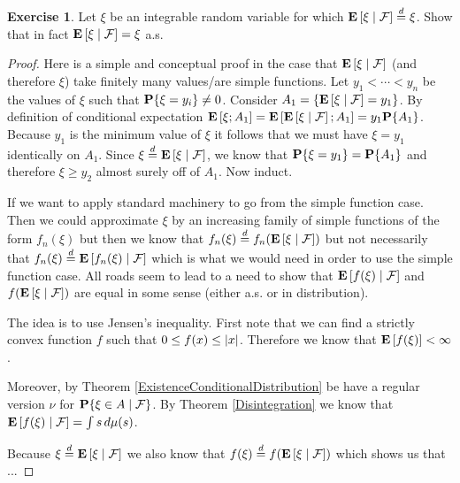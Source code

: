 \documentclass{amsart}
\theoremstyle{remark}
\theoremstyle{definition}
\newtheorem{ex}[thm]{Exercise}
\begin{document}
\begin{ex}Let $\xi$ be an integrable random variable for which
  $\cexpectationlong{\mathcal{F}}{\xi} \eqdist \xi$.  Show that in
  fact $\cexpectationlong{\mathcal{F}}{\xi} = \xi$ a.s.
\end{ex}
\begin{proof}
Here is a simple and conceptual proof in the case that
$\cexpectationlong{\mathcal{F}}{\xi}$ (and therefore $\xi$) take
finitely many values/are simple functions.  Let $y_1 < \cdots < y_n$ be the values of
$\xi$ such that $\probability{\xi = y_i} \neq 0$.   Consider $A_1 = \lbrace \cexpectationlong{\mathcal{F}}{\xi} =
y_1 \rbrace$.  By definition of conditional expectation
$\expectation{\xi ; A_1} =
\expectation{\cexpectationlong{\mathcal{F}}{\xi} ; A_1} = y_1
\probability{A_1}$.  Because $y_1$ is the minimum value of $\xi$ it
follows that we must have $\xi = y_1$ identically on $A_1$.  Since $\xi \eqdist
\cexpectationlong{\mathcal{F}}{\xi} $, we know that $\probability{\xi
  = y_1} = \probability{A_1}$ and therefore $\xi \geq y_2$ almost
surely off of $A_1$.  Now induct.

If we want to apply standard machinery to go from the
simple function case.  Then we could approximate $\xi$ by an
increasing family of simple functions of the form $f_n(\xi)$ but then
we know that $f_n(\xi) \eqdist
f_n(\cexpectationlong{\mathcal{F}}{\xi})$ but not necessarily that $f_n(\xi) \eqdist
\cexpectationlong{\mathcal{F}}{f_n(\xi)}$ which is what we would need
in order to use the simple function case.  All roads seem to lead to a
need to show that $\cexpectationlong{\mathcal{F}}{f(\xi)}$ and
$f(\cexpectationlong{\mathcal{F}}{\xi})$ are equal in some sense
(either a.s. or in distribution).

The idea is to use Jensen's inequality.  First note that
  we can find a strictly convex function $f$ such that $0 \leq f(x)
  \leq \abs{x}$.  Therefore we know that $\expectation{f(\xi)} <
  \infty$.  

Moreover, by Theorem \ref{ExistenceConditionalDistribution} be have a
regular version $\nu$ for $\cprobability{\mathcal{F}}{\xi \in A}$.  By
Theorem \ref{Disintegration} we know that
$\cexpectationlong{\mathcal{F}}{f(\xi)} = \int s \, d\mu(s)$.

Because $\xi \eqdist \cexpectationlong{\mathcal{F}}{\xi}$ we also know
that $f(\xi) \eqdist f(\cexpectationlong{\mathcal{F}}{\xi})$ which
shows us that ... 


\end{proof}
\end{document}

